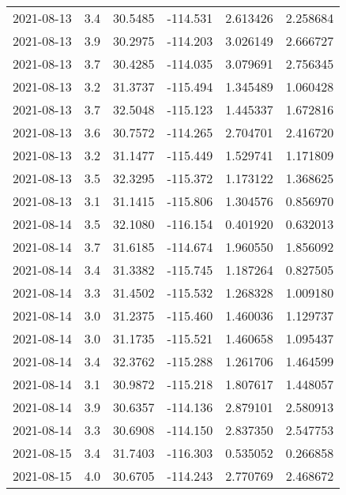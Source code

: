 \begin{tabular}{lrrrrr}
2021-08-13 &       3.4 &  30.5485 &  -114.531 &         2.613426 &         2.258684 \\
2021-08-13 &       3.9 &  30.2975 &  -114.203 &         3.026149 &         2.666727 \\
2021-08-13 &       3.7 &  30.4285 &  -114.035 &         3.079691 &         2.756345 \\
2021-08-13 &       3.2 &  31.3737 &  -115.494 &         1.345489 &         1.060428 \\
2021-08-13 &       3.7 &  32.5048 &  -115.123 &         1.445337 &         1.672816 \\
2021-08-13 &       3.6 &  30.7572 &  -114.265 &         2.704701 &         2.416720 \\
2021-08-13 &       3.2 &  31.1477 &  -115.449 &         1.529741 &         1.171809 \\
2021-08-13 &       3.5 &  32.3295 &  -115.372 &         1.173122 &         1.368625 \\
2021-08-13 &       3.1 &  31.1415 &  -115.806 &         1.304576 &         0.856970 \\
2021-08-14 &       3.5 &  32.1080 &  -116.154 &         0.401920 &         0.632013 \\
2021-08-14 &       3.7 &  31.6185 &  -114.674 &         1.960550 &         1.856092 \\
2021-08-14 &       3.4 &  31.3382 &  -115.745 &         1.187264 &         0.827505 \\
2021-08-14 &       3.3 &  31.4502 &  -115.532 &         1.268328 &         1.009180 \\
2021-08-14 &       3.0 &  31.2375 &  -115.460 &         1.460036 &         1.129737 \\
2021-08-14 &       3.0 &  31.1735 &  -115.521 &         1.460658 &         1.095437 \\
2021-08-14 &       3.4 &  32.3762 &  -115.288 &         1.261706 &         1.464599 \\
2021-08-14 &       3.1 &  30.9872 &  -115.218 &         1.807617 &         1.448057 \\
2021-08-14 &       3.9 &  30.6357 &  -114.136 &         2.879101 &         2.580913 \\
2021-08-14 &       3.3 &  30.6908 &  -114.150 &         2.837350 &         2.547753 \\
2021-08-15 &       3.4 &  31.7403 &  -116.303 &         0.535052 &         0.266858 \\
2021-08-15 &       4.0 &  30.6705 &  -114.243 &         2.770769 &         2.468672 \\

\end{tabular}
